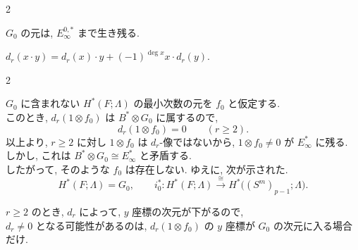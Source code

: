 \documentclass[10pt, leqno]{ltjsarticle} %
\numberwithin{equation}{section}
\theoremstyle{plain}
\theoremstyle{definition}
\theoremstyle{remark}
\begin{document}
\begin{paracol}{2}
\noindent
{}

\noindent
\(G_0\) の元は, \(E_\infty^{0,*}\) まで生き残る.

\noindent
\(d_r(x\cdot y) = d_r(x)\cdot y + (-1)^{\deg x}x\cdot d_r(y)\).



\end{paracol}

\begin{paracol}{2}

\noindent
$G_0$ に含まれない $H^{*}(F;\Lambda)$ の最小次数の元を $f_0$ と仮定する. \\
このとき, $d_r(1\otimes f_0)$ は $B^{*}\otimes G_0$ に属するので,
\[
d_r(1\otimes f_0)=0\qquad(r\ge2).
\]
以上より, $r\ge2$ に対し $1\otimes f_0$ は $d_r$-像ではないから, 
$1\otimes f_0\ne0$ が $E_\infty^{*}$ に残る. \\
しかし, これは $B^{*}\otimes G_0\cong E_\infty^{*}$ と矛盾する. \\
したがって, そのような $f_0$ は存在しない. ゆえに, 次が示された.
\[
H^{*}(F;\Lambda)=G_0,\qquad
i_0^{*}:H^{*}(F;\Lambda)\xrightarrow{\;\cong\;}
H^{*}\!\bigl((S^{m})_{p-1};\Lambda\bigr).
\]


\switchcolumn

\noindent
\(r\ge2\) のとき, \(d_r\) によって, \(y\) 座標の次元が下がるので,\\
\(d_r\ne 0\) となる可能性があるのは, 
\(d_r(1\otimes f_0)\) の \(y\) 座標が \(G_0\) の次元に入る場合だけ.

\end{paracol}
\end{document}
